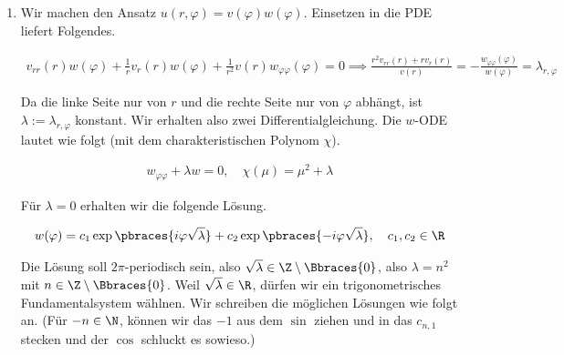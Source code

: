 \begin{comment}
\end{enumerate}

\end{solution}

\end{comment}


\begin{solution}

\phantom{}

\begin{enumerate}[label = (\roman*)]

    \item Wir machen den Ansatz $u(r, \varphi) = v(\varphi) w(\varphi)$.
    Einsetzen in die PDE liefert Folgendes.

    \begin{align*}
        v_{rr}(r) w(\varphi)
        +
        \frac{1}{r} 
        v_r(r)w(\varphi)
        +
        \frac{1}{r^2}
        v(r)w_{\varphi\varphi}(\varphi) = 0
        \implies
        \frac
        {
            r^2 v_{rr}(r)
            +
            r   v_r(r)
        }{v(r)}
        =
        -\frac
        {
            w_{\varphi \varphi}(\varphi)
        }{w(\varphi)}
        =
        \lambda_{r, \varphi}
    \end{align*}
    
    Da die linke Seite nur von $r$ und die rechte Seite nur von $\varphi$ abhängt, ist $\lambda := \lambda_{r, \varphi}$ konstant.
    Wir erhalten also zwei Differentialgleichung.
    Die $w$-ODE lautet wie folgt (mit dem charakteristischen Polynom $\chi$).

    \begin{align*}
        w_{\varphi \varphi} + \lambda w = 0,
        \quad
        \chi(\mu) = \mu^2 + \lambda
    \end{align*}
    
    Für $\lambda = 0$ erhalten wir die folgende Lösung.

    \begin{align*}
        w(\varphi)
        =
        c_1
        \exp \pbraces
        {
            i \varphi \sqrt{\lambda}
        }
        +
        c_2
        \exp \pbraces
        {
            -i \varphi \sqrt{\lambda}
        },
        \quad
        c_1, c_2 \in \R
    \end{align*}

    Die Lösung soll $2 \pi$-periodisch sein, also $\sqrt{\lambda} \in \Z \setminus \Bbraces{0}$, also $\lambda = n^2$ mit $n \in \Z \setminus \Bbraces{0}$.
    Weil $\sqrt{\lambda} \in \R$, dürfen wir ein trigonometrisches Fundamentalsystem wählnen.
    Wir schreiben die möglichen Lösungen wie folgt an.
    (Für $-n \in \N$, können wir das $-1$ aus dem $\sin$ ziehen und in das $c_{n, 1}$ stecken und der $\cos$ schluckt es sowieso.)


\end{enumerate}
\end{solution}
